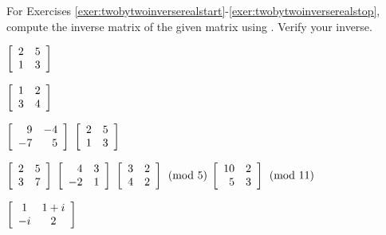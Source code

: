 \noindent For Exercises \ref{exer:twobytwoinverserealstart}-\ref{exer:twobytwoinverserealstop}, compute the inverse matrix of the given matrix using . Verify your inverse.  
\begin{enumerate}[!HW!, start]
\begin{multicols}{4}
\item\label{exer:twobytwoinverserealstart} $\mtx{rr}{2&5\\1&3}$ %
\item $\mtx{rr}{1&2\\3&4}$ %
\item $\mtx{rr}{9&-4\\-7&5}$ %
\itemspade $\mtx{rr}{2&5\\1&3}$
\end{multicols}
\begin{multicols}{4}
\itemspade $\mtx{rr}{2&5\\3&7}$
\itemspade $\mtx{rr}{4&3\\-2&1}$
\itemspade \mbox{$\mtx{rr}{3&2\\4&2} \pmod5$}
\itemspade \mbox{$\mtx{rr}{10&2\\5&3} \pmod{11}$}
\end{multicols}
\end{enumerate}
\begin{enumerate}[!HW!,label=$\spadesuit$ \arabic*., ref=\arabic*]
\begin{multicols}{4}
\item\label{exer:twobytwoinverserealstop} $ \mtx{cc}{1&1+i\\-i&2}$
\end{multicols}
\end{enumerate}


